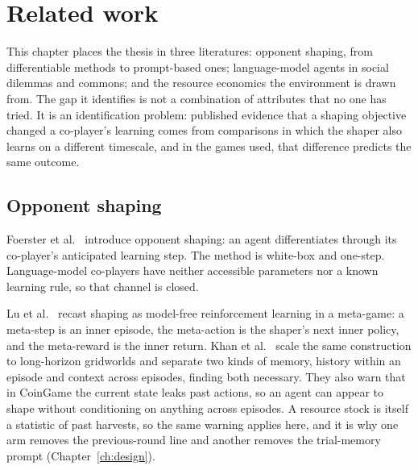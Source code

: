 \chapter{Related work}
\label{ch:lit}


This chapter places the thesis in three literatures: opponent shaping, from
differentiable methods to prompt-based ones; language-model agents in social
dilemmas and commons; and the resource economics the environment is drawn
from.
The gap it identifies is not a combination of attributes that no one has
tried.
It is an identification problem: published evidence that a shaping objective
changed a co-player's learning comes from comparisons in which the shaper
also learns on a different timescale, and in the games used, that difference
predicts the same outcome.

\section{Opponent shaping}
\label{sec:lit-shaping}

Foerster et al.\ \cite{foerster2018} introduce opponent shaping: an agent
differentiates through its co-player's anticipated learning step.
The method is white-box and one-step.
Language-model co-players have neither accessible parameters nor a known
learning rule, so that channel is closed.

Lu et al.\ \cite{lu2022} recast shaping as model-free reinforcement learning
in a meta-game: a meta-step is an inner episode, the meta-action is the
shaper's next inner policy, and the meta-reward is the inner return.
Khan et al.\ \cite{khan2024} scale the same construction to long-horizon
gridworlds and separate two kinds of memory, history within an episode and
context across episodes, finding both necessary.
They also warn that in CoinGame the current state leaks past actions, so an
agent can appear to shape without conditioning on anything across episodes.
A resource stock is itself a statistic of past harvests, so the same warning
applies here, and it is why one arm removes the previous-round line and
another removes the trial-memory prompt (Chapter~\ref{ch:design}).

